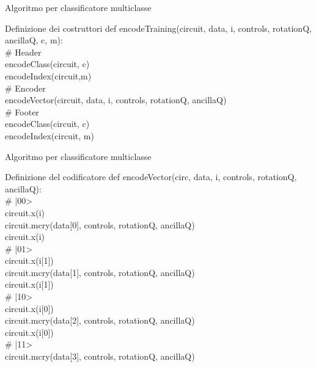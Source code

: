 \documentclass{beamer}
\begin{document}
    \begin{frame}{Algoritmo per classificatore multiclasse}
        \begin{block}{Definizione dei costruttori}
            def encodeTraining(circuit, data, i, controls, rotationQ, ancillaQ, c, m): \\
            \# Header \\
            encodeClass(circuit, c) \\
            encodeIndex(circuit,m) \\
            \# Encoder \\
            encodeVector(circuit, data, i, controls, rotationQ, ancillaQ) \\
            \# Footer \\
            encodeClass(circuit, c) \\
            encodeIndex(circuit, m)
        \end{block}
    \end{frame}

    \begin{frame}{Algoritmo per classificatore multiclasse}
        \begin{block}{Definizione del codificatore}
            def encodeVector(circ, data, i, controls, rotationQ, ancillaQ): \\
            \# |00>\\
            circuit.x(i)\\
            circuit.mcry(data[0], controls, rotationQ, ancillaQ)\\
            circuit.x(i)\\
            \# |01>\\
            circuit.x(i[1])\\
            circuit.mcry(data[1], controls, rotationQ, ancillaQ)\\
            circuit.x(i[1])\\
            \# |10>\\
            circuit.x(i[0])\\
            circuit.mcry(data[2], controls, rotationQ, ancillaQ)\\
            circuit.x(i[0])\\
            \# |11>\\
            circuit.mcry(data[3], controls, rotationQ, ancillaQ)
        \end{block}
    \end{frame}
\end{document}
